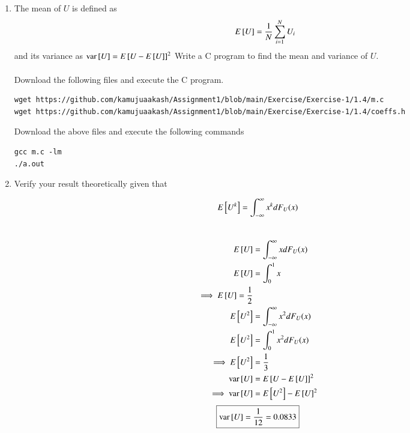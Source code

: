 \documentclass[journal,12pt,twocolumn]{IEEEtran}
\renewcommand\thesection{\arabic{section}}
\begin{document}
\begin{enumerate}[label=\thesection.\arabic*
,ref=\thesection.\theenumi]
\begin{align*}
{\implies F_U(x)=
\begin{cases}
 0 &x\le0\\
 x &0< x< 1\\
 1 &x\ge 1
\end{cases}}
\end{align*}
\item
The mean of $U$ is defined as
%
\begin{equation}
E{}\left[U\right] = \frac{1}{N}\sum_{i=1}^{N}U_i
\end{equation}
%
and its variance as
%
$
\text{var}{}\left[U\right] = E{}\left[U- E{}\left[U\right]\right]^2 
$
Write a C program to  find the mean and variance of $U$. \\
\solution \\Download the following files and execute the  C program.\\
\begin{lstlisting}
wget https://github.com/kamujuaakash/Assignment1/blob/main/Exercise/Exercise-1/1.4/m.c
wget https://github.com/kamujuaakash/Assignment1/blob/main/Exercise/Exercise-1/1.4/coeffs.h
\end{lstlisting}
Download the above files and execute the following commands
\begin{lstlisting}
gcc m.c -lm
./a.out
\end{lstlisting}
\item Verify your result theoretically given that
\end{enumerate}
%
$$
E{}\left[U^k\right] = \int_{-\infty}^{\infty}x^kdF_{U}(x)
$$
\solution \\
\begin{align*}
    E{}\left[U\right]&=\int_{-\infty}^{\infty}xdF_U(x)\\
    E{}\left[U\right]&=\int_{0}^{1}x\\
    \implies E{}\left[U\right]=\frac{1}{2}\\
    E{}\left[U^2\right]&=\int_{-\infty}^{\infty}x^{2}dF_U(x)\\
    E{}\left[U^2\right]&=\int_{0}^{1}x^{2}dF_U(x)\\
    \implies E{}\left[U^2\right]&=\frac{1}{3}\\
    \text{var}{}\left[U\right] &= E{}\left[U- E{}\left[U\right]\right]^2\\ 
    \implies \text{var}{}\left[U\right] &= E{}\left[U^2\right]- E{}\left[U\right]^2 
\end{align*}
$$ \boxed{\text{var}{}\left[U\right]=\frac{1}{12}=0.0833}$$
\end{document}

